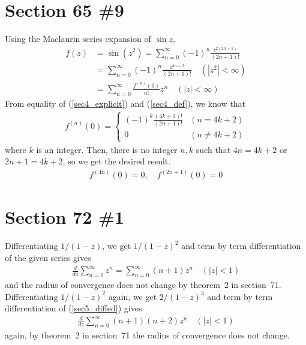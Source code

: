 \documentclass{scrartcl}
\begin{document}
\section{Section 65 \#9}
Using the Maclaurin series expansion of \(\sin z\),
\begin{align}
  \nonumber f(z)
  \nonumber &= \sin (z^2)
  \nonumber = \sum^\infty_{n = 0} (-1)^{n} \frac{z^{2(2n + 1)}}{(2n + 1)!} \\
  \label{sec4_explicit} &= \sum^\infty_{n = 0} (-1)^n \frac{z^{4n + 2}}{(2n + 1)!} \quad (|z^2| < \infty) \\
  \label{sec4_def} &= \sum^\infty_{n = 0} \frac{f^{(n)}(0)}{n!} z^n \quad (|z| < \infty)
\end{align}
From equality of (\ref{sec4_explicit}) and (\ref{sec4_def}), we know that
\begin{align*}
  f^{(n)}(0) = \begin{cases}
    (-1)^k \frac{(4k + 2)!}{(2n + 1)!} & (n = 4k + 2) \\
    0 & (n \not = 4k + 2)
  \end{cases}
\end{align*}
where \(k\) is an integer.
Then, there is no integer \(n, k\) such that \(4n = 4k + 2\) or \(2n + 1 = 4k + 2\), so we get the desired result.
\begin{align*}
  f^{(4n)}(0) = 0, \quad f^{(2n + 1)}(0) = 0
\end{align*}

\section{Section 72 \#1}
Differentiating \(1 / (1 - z)\), we get \(1 / (1 - z)^2\) and term by term differentiation of the given series gives
\begin{align}\label{sec5_diffed}
  \frac{d}{dz} \sum^\infty_{n = 0} z^n = \sum^\infty_{n = 0} (n + 1)z^n \quad (|z| < 1)
\end{align}
and the radius of convergence does not change by theorem~2 in section~71.
Differentiating \(1 / (1 - z)^2\) again, we get \(2 / (1 - z)^3\) and term by term differentiation of (\ref{sec5_diffed}) gives
\begin{align*}
  \frac{d}{dz} \sum^\infty_{n = 0} (n + 1)(n + 2)z^n \quad (|z| < 1)
\end{align*}
again, by theorem~2 in section~71 the radius of convergence does not change.
\end{document}
